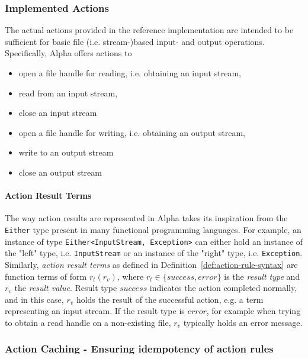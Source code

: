 \subsubsection{Implemented Actions}
\label{subsubsec:implementation-actions-basic-actions}

The actual actions provided in the reference implementation are intended to be sufficient for basic file (i.e. stream-)based input- and output operations. Specifically, Alpha offers actions to
\begin{itemize}
    \item open a file handle for reading, i.e. obtaining an input stream,
    \item read from an input stream,
    \item close an input stream
    \item open a file handle for writing, i.e. obtaining an output stream,
    \item write to an output stream
    \item close an output stream
\end{itemize}

\paragraph{Action Result Terms} The way action results are represented in Alpha takes its inspiration from the \texttt{Either} type present in many functional programming languages. For example, an instance of type \texttt{Either<InputStream, Exception>}
can either hold an instance of the "left" type, i.e. \texttt{InputStream} or an instance of the "right" type, i.e. \texttt{Exception}. Similarly, \emph{action result terms} as defined in Definition~\ref{def:action-rule-syntax} are function terms of form $r_t(r_v)$, where $r_t \in \{success, error\}$ is the \emph{result type} and $r_v$ the \emph{result value}. Result type $success$ indicates the action completed normally, and in this case, $r_v$ holds the result of the successful action, e.g. a term representing an input stream. If the result type is $error$, for example when trying to obtain a read handle on a non-existing file, $r_v$ typically holds an error message.


\subsubsection{Action Caching - Ensuring idempotency of action rules}
\label{subsubsec:implementation-actions-caching}

